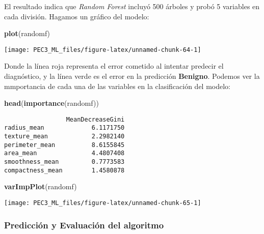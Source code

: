 \documentclass[
]{article}
\newenvironment{Shaded}{\begin{snugshade}}{\end{snugshade}}
\newcommand{\KeywordTok}[1]{\textcolor[rgb]{0.13,0.29,0.53}{\textbf{#1}}}
\newcommand{\NormalTok}[1]{#1}
\begin{document}
El resultado indica que \emph{Random Forest} incluyó 500 árboles y probó
5 variables en cada división. Hagamos un gráfico del modelo:

\begin{Shaded}
\begin{Highlighting}[]
\KeywordTok{plot}\NormalTok{(randomf)}
\end{Highlighting}
\end{Shaded}

\begin{center}\texttt{[image: PEC3\_ML\_files/figure-latex/unnamed-chunk-64-1]} \end{center}

Donde la línea roja representa el error cometido al intentar predecir el
diagnóstico, y la línea verde es el error en la predicción
\textbf{Benigno}. Podemos ver la mmportancia de cada una de las
variables en la clasificación del modelo:

\begin{Shaded}
\begin{Highlighting}[]
\KeywordTok{head}\NormalTok{(}\KeywordTok{importance}\NormalTok{(randomf))}
\end{Highlighting}
\end{Shaded}

\begin{verbatim}
                 MeanDecreaseGini
radius_mean             6.1171750
texture_mean            2.2982140
perimeter_mean          8.6155845
area_mean               4.4807408
smoothness_mean         0.7773583
compactness_mean        1.4580878
\end{verbatim}

\begin{Shaded}
\begin{Highlighting}[]
\KeywordTok{varImpPlot}\NormalTok{(randomf)}
\end{Highlighting}
\end{Shaded}

\begin{center}\texttt{[image: PEC3\_ML\_files/figure-latex/unnamed-chunk-65-1]} \end{center}

\hypertarget{predicciuxf3n-y-evaluaciuxf3n-del-algoritmo-4}{%
\subsubsection{Predicción y Evaluación del
algoritmo}\label{predicciuxf3n-y-evaluaciuxf3n-del-algoritmo-4}}
\end{document}
